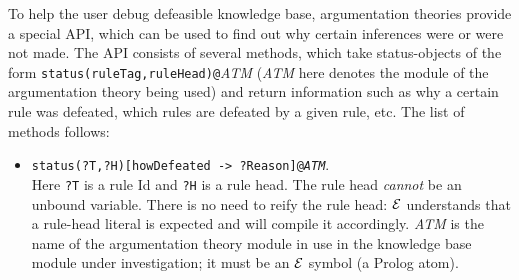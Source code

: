\documentclass[11pt]{article}
\newcommand{\ERGO}{\mbox{\ensuremath{\cal{E}}\smaller{{\sc{RGO}}}}\xspace}
\newcommand{\FLSYSTEM}{\ERGO}
\begin{document}
To help the user debug defeasible knowledge base, argumentation
theories provide a special API, which can be used to find out
why certain inferences were or were not made.
The API consists of several methods, which take status-objects of the form
\texttt{status(ruleTag,ruleHead)@}\emph{ATM} (\emph{ATM} here denotes the
module of the argumentation theory being used)
and return information such as why a certain
rule was defeated, which rules are defeated by a given rule, etc.
The list of methods follows:
\begin{itemize}
\item  {\tt status(?T,?H)[howDefeated -> ?Reason]@\emph{ATM}}.\\
  Here {\tt ?T} is a rule Id and {\tt ?H} is a rule head. The rule head
  \emph{cannot} be an unbound  variable. There is no need to reify the rule head: \FLSYSTEM
  understands that a rule-head literal is expected and will compile it
  accordingly.  
  \emph{ATM}  is the name of the argumentation theory module
  in use in the knowledge base module under investigation; it must be an
  \ERGO symbol (a Prolog atom).


\end{itemize}
\end{document}
